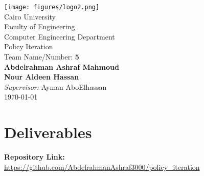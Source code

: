 \documentclass[a4paper,11pt,oneside]{book}
\begin{document}
    
    \frontmatter
    
    \begin{titlepage}  
        \begin{center}
            \texttt{[image: figures/logo2.png]}\\[0.5cm]
            {\LARGE Cairo University\\[0.5cm]
            Faculty of Engineering\\[0.5cm] Computer Engineering Department}\\[2cm]
			
            \linespread{1.2}\huge {
                Policy Iteration
            }
            \linespread{1}~\\[2cm]

            {\Large 
                Team Name/Number: \textbf{5}\\[0.5cm]
                \textbf{Abdelrahman Ashraf Mahmoud}\\[0.3cm]
                \textbf{Nour Aldeen Hassan}
            }\\[1cm] 
            
            {\large 
                \emph{Supervisor:} Ayman AboElhassan}\\[1cm]
            
            \today
        \end{center}
    \end{titlepage}
    
    \mainmatter

\chapter*{Deliverables}
    
    \noindent\textbf{Repository Link:} \\
    \url{https://github.com/AbdelrahmanAshraf3000/policy_iteration} \\[0.5cm]
    
\end{document}
